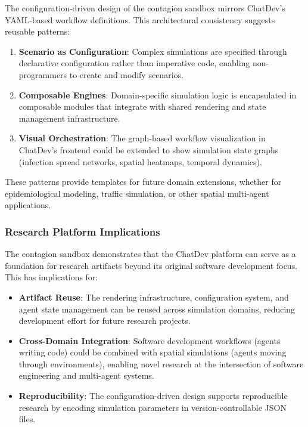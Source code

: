 The configuration-driven design of the contagion sandbox mirrors ChatDev's YAML-based workflow definitions. This architectural consistency suggests reusable patterns:

\begin{enumerate}
    \item \textbf{Scenario as Configuration}: Complex simulations are specified through declarative configuration rather than imperative code, enabling non-programmers to create and modify scenarios.
    
    \item \textbf{Composable Engines}: Domain-specific simulation logic is encapsulated in composable modules that integrate with shared rendering and state management infrastructure.
    
    \item \textbf{Visual Orchestration}: The graph-based workflow visualization in ChatDev's frontend could be extended to show simulation state graphs (infection spread networks, spatial heatmaps, temporal dynamics).
\end{enumerate}

These patterns provide templates for future domain extensions, whether for epidemiological modeling, traffic simulation, or other spatial multi-agent applications.

\subsubsection{Research Platform Implications}

The contagion sandbox demonstrates that the ChatDev platform can serve as a foundation for research artifacts beyond its original software development focus. This has implications for:

\begin{itemize}
    \item \textbf{Artifact Reuse}: The rendering infrastructure, configuration system, and agent state management can be reused across simulation domains, reducing development effort for future research projects.
    
    \item \textbf{Cross-Domain Integration}: Software development workflows (agents writing code) could be combined with spatial simulations (agents moving through environments), enabling novel research at the intersection of software engineering and multi-agent systems.
    
    \item \textbf{Reproducibility}: The configuration-driven design supports reproducible research by encoding simulation parameters in version-controllable JSON files.
\end{itemize}

